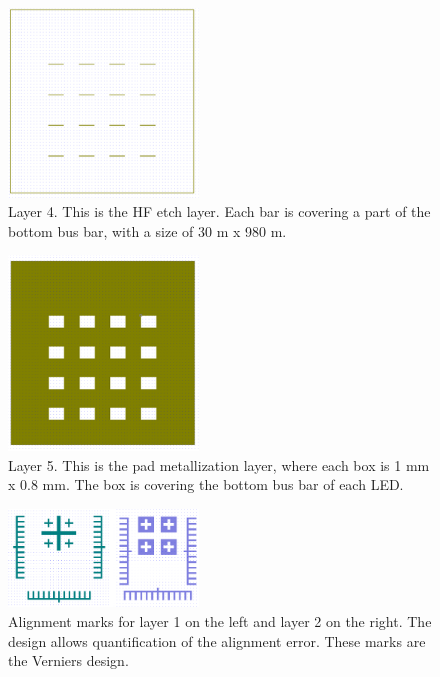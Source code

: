 \begin{figure}[ht]
    \centering
    \includegraphics[width=0.45\textwidth]{figures/CleWin_L4.png}
    \caption{
        Layer 4. 
        This is the HF etch layer. 
        Each bar is covering a part of the bottom bus bar, with a size of 30 \textmu m x 980 \textmu m.
    }
    \label{fig:CleWin_L4}
\end{figure}

\begin{figure}[ht]
    \centering
    \includegraphics[width=0.45\textwidth]{figures/CleWin_L5.png}
    \caption{
        Layer 5. 
        This is the pad metallization layer, where each box is 1 mm x 0.8 mm. 
        The box is covering the bottom bus bar of each LED. 
    }
    \label{fig:CleWin_L5}
\end{figure}


\begin{figure}[ht]
    \centering
    \includegraphics[width=0.45\textwidth]{figures/CleWin_alignment_marks.png}
    \caption{
        Alignment marks for layer 1 on the left and layer 2 on the right. 
        The design allows quantification of the alignment error.
        These marks are the Verniers design. 
    }
    \label{fig:CleWin_alignment_marks}
\end{figure}




